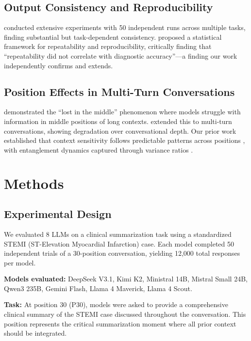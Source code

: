 \documentclass[11pt]{article}
\begin{document}
\subsection{Output Consistency and Reproducibility}

\citet{wang2025consistency} conducted extensive experiments with 50 independent runs across multiple tasks, finding substantial but task-dependent consistency. \citet{shyr2025statistical} proposed a statistical framework for repeatability and reproducibility, critically finding that ``repeatability did not correlate with diagnostic accuracy''---a finding our work independently confirms and extends.

\subsection{Position Effects in Multi-Turn Conversations}

\citet{liu2024lost} demonstrated the ``lost in the middle'' phenomenon where models struggle with information in middle positions of long contexts. \citet{laban2025lost} extended this to multi-turn conversations, showing degradation over conversational depth. Our prior work established that context sensitivity follows predictable patterns across positions \citep{laxman2026context}, with entanglement dynamics captured through variance ratios \citep{laxman2026entanglement}.

\section{Methods}

\subsection{Experimental Design}

We evaluated 8 LLMs on a clinical summarization task using a standardized STEMI (ST-Elevation Myocardial Infarction) case. Each model completed 50 independent trials of a 30-position conversation, yielding 12,000 total responses per model.

\textbf{Models evaluated:} DeepSeek V3.1, Kimi K2, Ministral 14B, Mistral Small 24B, Qwen3 235B, Gemini Flash, Llama 4 Maverick, Llama 4 Scout.

\textbf{Task:} At position 30 (P30), models were asked to provide a comprehensive clinical summary of the STEMI case discussed throughout the conversation. This position represents the critical summarization moment where all prior context should be integrated.
\end{document}
